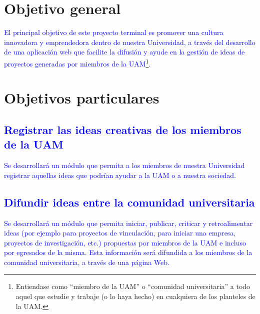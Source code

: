 \documentclass[11pt,letterpaper,titlepage]{article}
\begin{document}
\section{Objetivo general}
\textcolor{blue}{El principal objetivo de este proyecto terminal es promover una cultura innovadora y emprendedora dentro de nuestra Universidad, a trav\'es del desarrollo de una aplicaci\'on web que facilite la difusi\'on y ayude en la gesti\'on de ideas de proyectos generadas por miembros de la UAM}\footnote{Entiendase como ``miembro de la UAM'' o ``comunidad universitaria'' a todo aquel que estudie y trabaje (o lo haya hecho) en cualquiera de los planteles de la UAM.}.




\section{Objetivos particulares}
\textcolor{blue}{
\subsection{Registrar las ideas creativas de los miembros de la UAM}
Se desarrollar\'a un m\'odulo que permita a los miembros de nuestra Universidad registrar aquellas ideas que podr\'ian ayudar a la UAM o a nuestra sociedad. }


\textcolor{blue}{
\subsection{Difundir ideas entre la comunidad universitaria}
Se desarrollar\'a un m\'odulo que permita iniciar, publicar, criticar y retroalimentar ideas (por ejemplo para proyectos de vinculaci\'on, para iniciar una empresa, proyectos de investigaci\'on, etc.) propuestas por miembros de la UAM e incluso por egresados de la misma. Esta informaci\'on ser\'a difundida a los miembros de la comunidad universitaria, a trav\'es de una p\'agina Web.}
\end{document}
